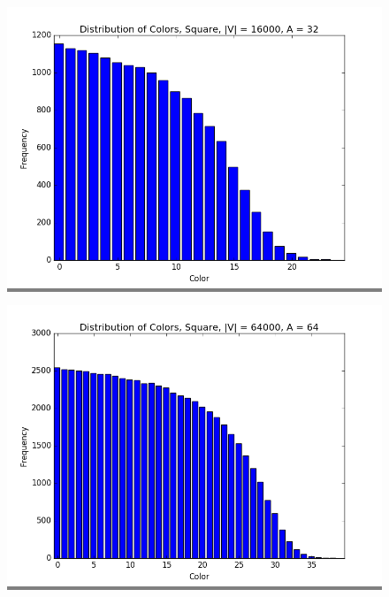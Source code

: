\documentclass{article}
\begin{document}
\begin{figure}
\begin{minipage}{0.3\textwidth}
    \colorbox{gray}{\includegraphics[width=\linewidth]{./graphs/hist_colors_square_2.png}}
    \end{minipage}
    \vskip 0.1in
    \begin{minipage}{0.3\textwidth}
    \colorbox{gray}{\includegraphics[width=\linewidth]{./graphs/hist_colors_square_3.png}}
    \end{minipage}
    \hspace{\fill}
    \begin{minipage}{0.3\textwidth}

\end{minipage}
\end{figure}
\end{document}
